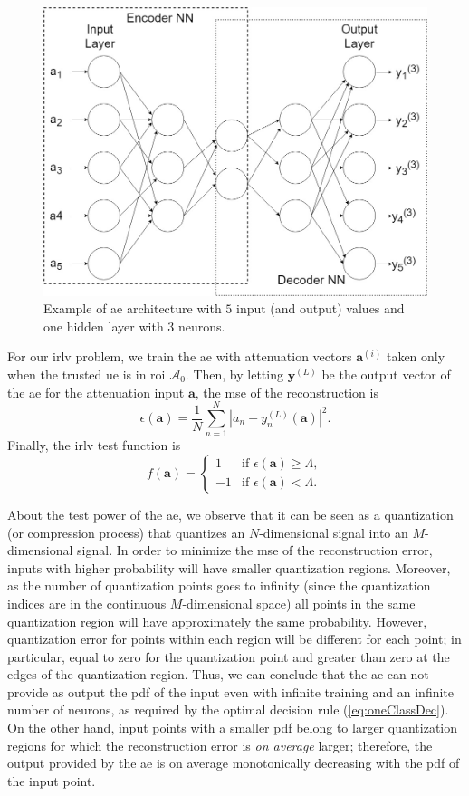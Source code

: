 \documentclass[draftcls,onecolumn,12pt]{IEEEtran}
\begin{document}
\begin{figure}[t]
    \centering
    \includegraphics[width=0.5\columnwidth]{AE.jpg}
    \caption{Example of \ac{ae} architecture with $5$ input (and output) values and one hidden layer with 3 neurons.} 
    \label{fig:aeArch}
\end{figure}

For our \ac{irlv} problem, we train the \ac{ae} with attenuation vectors $\bm{a}^{(i)}$ taken only when the trusted \ac{ue} is in  \ac{roi} $\mathcal A_0$. Then, by letting $\bm{y}^{(L)}$ be the output vector of the \ac{ae} for the attenuation input $\bm{a}$, the \ac{mse} of the reconstruction is 
\begin{equation}\label{eq: rec err}
    \epsilon(\bm{a} ) = \frac{1}{N}\sum_{n=1}^{N}|a_n-y^{(L)}_n(\bm{a})|^2.
\end{equation}
Finally, the \ac{irlv} test function  is  
\begin{equation}
f(\bm{a}) =
\begin{cases}
1 &\text{if } \epsilon(\bm{a} ) \geq \Lambda, \\
-1 & \text{if } \epsilon(\bm{a} ) < \Lambda.
\end{cases}
\end{equation}

About the test power of the \ac{ae}, we observe that it can be seen as a quantization (or compression process) that quantizes an $N$-dimensional signal into an $M$-dimensional signal. In order to minimize the \ac{mse} of the reconstruction error, inputs with higher probability will have smaller quantization regions. Moreover, as the number of quantization points goes to infinity (since the quantization indices are in the continuous $M$-dimensional space) all points in the same quantization region will have approximately the same probability. However, quantization error for points within each region will be different for each point; in particular, equal to zero for the quantization point and greater than zero at the edges of the quantization region. Thus, we can conclude that the \ac{ae} can not provide as output the \ac{pdf} of the input even with infinite training and an infinite number of neurons, as required by the optimal decision rule (\ref{eq:oneClassDec}). On the other hand, input points with a smaller \ac{pdf} belong to larger quantization regions for which the reconstruction error is {\em on average} larger; therefore, the output provided by the \ac{ae} is on average monotonically decreasing with the \ac{pdf} of the input point. 
\end{document}
